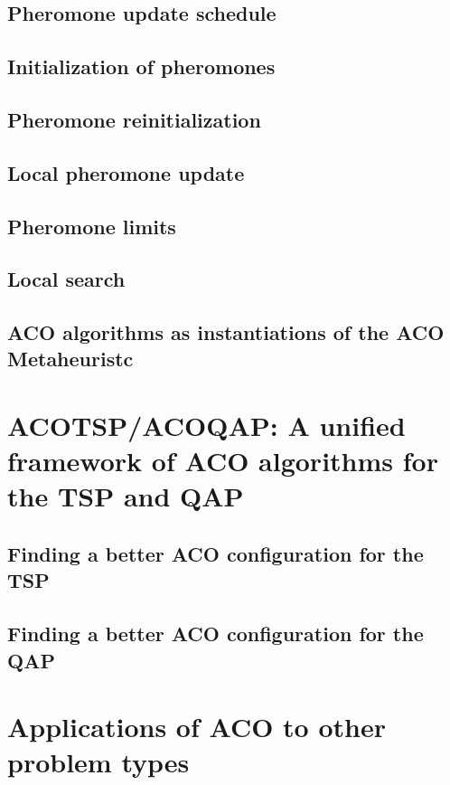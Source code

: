 \documentclass[12pt]{article}
\begin{document}
\subsection{Pheromone update schedule}

\subsection{Initialization of pheromones}

\subsection{Pheromone reinitialization}

\subsection{Local pheromone update}

\subsection{Pheromone limits}

\subsection{Local search}

\subsection{ACO algorithms as instantiations of the ACO Metaheuristc}

\section{ACOTSP/ACOQAP: A unified framework of ACO algorithms
for the TSP and QAP}

\subsection{Finding a better ACO configuration for the TSP}

\subsection{Finding a better ACO configuration for the QAP}

\section{Applications of ACO to other problem types}
\end{document}
